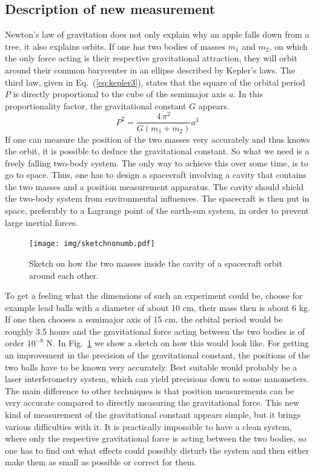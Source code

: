 \documentclass[prb,preprint]{revtex4-1}
\begin{document}
\subsection{Description of new measurement}
Newton's law of gravitation does not only explain why an apple falls down from a tree, it also explains orbits. If one has two bodies of masses $m_1$ and $m_2$, on which the only force acting is their respective gravitational attraction, they will orbit around their common barycenter in an ellipse described by Kepler's laws. The third law, given in Eq.~(\ref{eq:kepler3}), states that the square of the orbital period $P$ is directly proportional to the cube of the semimajor axis $a$. In this proportionality factor, the gravitational constant $G$ appears.
\begin{equation}\label{eq:kepler3}
P^2 = \frac{4 \, \pi^2}{G(m_1+m_2)}a^3
\end{equation}
If one can measure the position of the two masses very accurately and thus knows the orbit, it is possible to deduce the gravitational constant. 
So what we need is a freely falling two-body system. The only way to achieve this over some time, is to go to space. Thus, one has to design a spacecraft involving a cavity that contains the two masses and a position measurement apparatus. The cavity should shield the two-body system from environmental influences. The spacecraft is then put in space, preferably to a Lagrange point of the earth-sun system, in order to prevent large inertial forces.\\

\begin{figure}
	\centering
	\texttt{[image: img/sketchnonumb.pdf]}
	\caption{Sketch on how the two masses inside the cavity of a spacecraft orbit around each other.}
	\label{fig:sketch}
\end{figure}

To get a feeling what the dimensions of such an experiment could be, choose for example lead balls with a diameter of about 10 cm, their mass then is about 6 kg. If one then chooses a semimajor axis of 15 cm, the orbital period would be roughly 3.5 hours and the gravitational force acting between the two bodies is of order $10^{-8}$ N. In Fig.~\ref{fig:sketch} we show a sketch on how this would look like.
For getting an improvement in the precision of the gravitational constant, the positions of the two balls have to be known very accurately. Best suitable would probably be a laser interferometry system, which can yield precisions down to some nanometers.\cite{Loughridge13}
The main difference to other techniques is that position measurements can be very accurate compared to directly measuring the gravitational force.
This new kind of measurement of the gravitational constant appears simple, but it brings various difficulties with it. It is practically impossible to have a clean system, where only the respective gravitational force is acting between the two bodies, so one has to find out what effects could possibly disturb the system and then either make them as small as possible or correct for them. \\
\end{document}
